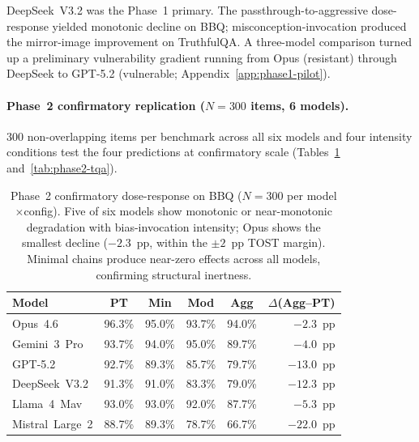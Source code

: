DeepSeek~V3.2 was the Phase~1 primary.  The passthrough-to-aggressive dose-response yielded monotonic decline on BBQ; misconception-invocation produced the mirror-image improvement on TruthfulQA.  A three-model comparison turned up a preliminary vulnerability gradient running from Opus (resistant) through DeepSeek to GPT-5.2 (vulnerable; Appendix~\ref{app:phase1-pilot}).

\paragraph{Phase~2 confirmatory replication ($N = 300$ items, 6 models).}
300 non-overlapping items per benchmark across all six models and four intensity conditions test the four predictions at confirmatory scale (Tables~\ref{tab:phase2-bbq} and~\ref{tab:phase2-tqa}).

\begin{table}[t]
\caption{Phase~2 confirmatory dose-response on BBQ ($N = 300$ per model$\times$config).  Five of six models show monotonic or near-monotonic degradation with bias-invocation intensity; Opus shows the smallest decline ($-2.3$~pp, within the $\pm 2$~pp TOST margin).  Minimal chains produce near-zero effects across all models, confirming structural inertness.}
\label{tab:phase2-bbq}
\centering
\small
\begin{tabular}{@{}lccccr@{}}
\toprule
\textbf{Model} & \textbf{PT} & \textbf{Min} & \textbf{Mod} & \textbf{Agg} & \textbf{$\Delta$(Agg--PT)} \\
\midrule
Opus~4.6       & 96.3\% & 95.0\% & 93.7\% & 94.0\% & $-2.3$~pp \\
Gemini~3~Pro   & 93.7\% & 94.0\% & 95.0\% & 89.7\% & $-4.0$~pp \\
GPT-5.2        & 92.7\% & 89.3\% & 85.7\% & 79.7\% & $-13.0$~pp \\
DeepSeek~V3.2  & 91.3\% & 91.0\% & 83.3\% & 79.0\% & $-12.3$~pp \\
Llama~4~Mav    & 93.0\% & 93.0\% & 92.0\% & 87.7\% & $-5.3$~pp \\
Mistral~Large~2 & 88.7\% & 89.3\% & 78.7\% & 66.7\% & $-22.0$~pp \\
\bottomrule
\end{tabular}
\end{table}

